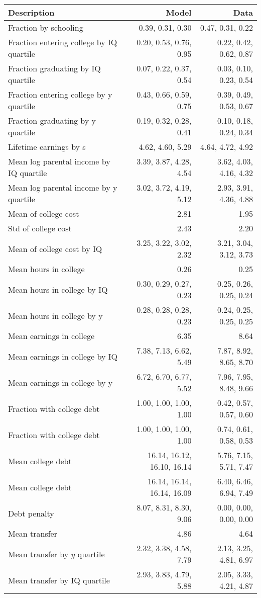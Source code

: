 \begin{tabular}{lrr}
\hline
Description & Model  & Data  \\
\hline
Fraction by schooling & 0.39, 0.31, 0.30  & 0.47, 0.31, 0.22  \\
Fraction entering college by IQ quartile & 0.20, 0.53, 0.76, 0.95  & 0.22, 0.42, 0.62, 0.87  \\
Fraction graduating by IQ quartile & 0.07, 0.22, 0.37, 0.54  & 0.03, 0.10, 0.23, 0.54  \\
Fraction entering college by y quartile & 0.43, 0.66, 0.59, 0.75  & 0.39, 0.49, 0.53, 0.67  \\
Fraction graduating by y quartile & 0.19, 0.32, 0.28, 0.41  & 0.10, 0.18, 0.24, 0.34  \\
Lifetime earnings by s & 4.62, 4.60, 5.29  & 4.64, 4.72, 4.92  \\
Mean log parental income by IQ quartile & 3.39, 3.87, 4.28, 4.54  & 3.62, 4.03, 4.16, 4.32  \\
Mean log parental income by y quartile & 3.02, 3.72, 4.19, 5.12  & 2.93, 3.91, 4.36, 4.88  \\
Mean of college cost & 2.81  & 1.95  \\
Std of college cost & 2.43  & 2.20  \\
Mean of college cost by IQ & 3.25, 3.22, 3.02, 2.32  & 3.21, 3.04, 3.12, 3.73  \\
Mean hours in college & 0.26  & 0.25  \\
Mean hours in college by IQ & 0.30, 0.29, 0.27, 0.23  & 0.25, 0.26, 0.25, 0.24  \\
Mean hours in college by y & 0.28, 0.28, 0.28, 0.23  & 0.24, 0.25, 0.25, 0.25  \\
Mean earnings in college & 6.35  & 8.64  \\
Mean earnings in college by IQ & 7.38, 7.13, 6.62, 5.49  & 7.87, 8.92, 8.65, 8.70  \\
Mean earnings in college by y & 6.72, 6.70, 6.77, 5.52  & 7.96, 7.95, 8.48, 9.66  \\
Fraction with college debt & 1.00, 1.00, 1.00, 1.00  & 0.42, 0.57, 0.57, 0.60  \\
Fraction with college debt & 1.00, 1.00, 1.00, 1.00  & 0.74, 0.61, 0.58, 0.53  \\
Mean college debt & 16.14, 16.12, 16.10, 16.14  & 5.76, 7.15, 5.71, 7.47  \\
Mean college debt & 16.14, 16.14, 16.14, 16.09  & 6.40, 6.46, 6.94, 7.49  \\
Debt penalty & 8.07, 8.31, 8.30, 9.06  & 0.00, 0.00, 0.00, 0.00  \\
Mean transfer & 4.86  & 4.64  \\
Mean transfer by $y$ quartile & 2.32, 3.38, 4.58, 7.79  & 2.13, 3.25, 4.81, 6.97  \\
Mean transfer by IQ quartile & 2.93, 3.83, 4.79, 5.88  & 2.05, 3.33, 4.21, 4.87  \\
\hline
\end{tabular}%
